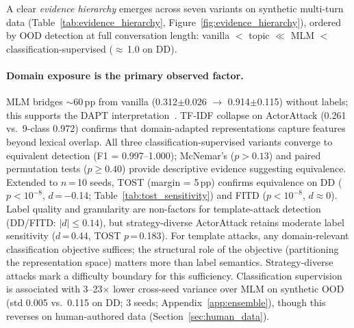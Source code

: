 A clear \emph{evidence hierarchy} emerges across seven variants on synthetic multi-turn data (Table~\ref{tab:evidence_hierarchy}, Figure~\ref{fig:evidence_hierarchy}), ordered by OOD detection at full conversation length: vanilla $<$ topic $\ll$ MLM $<$ classification-supervised ($\approx$\,1.0 on DD).

\paragraph{Domain exposure is the primary observed factor.}
MLM bridges $\sim$60\,pp from vanilla (0.312$\pm$0.026 $\to$ 0.914$\pm$0.115) without labels; this supports the DAPT interpretation~\citep{gururangan2020dontstop}. TF-IDF collapse on ActorAttack (0.261 vs.\ 9-class 0.972) confirms that domain-adapted representations capture features beyond lexical overlap.
All three classification-supervised variants converge to equivalent detection (F1 = 0.997--1.000); McNemar's ($p > 0.13$) and paired permutation tests ($p \geq 0.40$) provide descriptive evidence suggesting equivalence. Extended to $n$\,=\,10 seeds, TOST (margin = 5\,pp) confirms equivalence on DD ($p < 10^{-8}$, $d$\,=\,$-$0.14; Table~\ref{tab:tost_sensitivity}) and FITD ($p < 10^{-8}$, $d \approx 0$). Label quality and granularity are non-factors for template-attack detection (DD/FITD: $|d| \leq 0.14$), but strategy-diverse ActorAttack retains moderate label sensitivity ($d$\,=\,0.44, TOST $p$\,=\,0.183). For template attacks, any domain-relevant classification objective suffices; the structural role of the objective (partitioning the representation space) matters more than label semantics. Strategy-diverse attacks mark a difficulty boundary for this sufficiency.
Classification supervision is associated with 3--23$\times$ lower cross-seed variance over MLM on synthetic OOD (std 0.005 vs.\ 0.115 on DD; 3 seeds; Appendix~\ref{app:ensemble}), though this reverses on human-authored data (Section~\ref{sec:human_data}).

